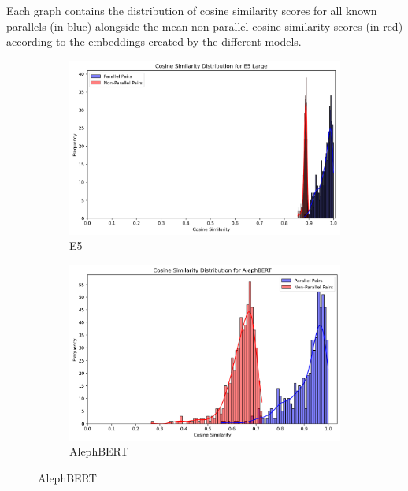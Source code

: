 \documentclass[12pt]{article}
\begin{document}
Each graph contains the distribution of cosine similarity scores for all known parallels (in blue) alongside the mean non-parallel cosine similarity scores (in red) according to the embeddings created by the different models.

\begin{figure}[htbp]
\centering

\begin{subfigure}{0.45\textwidth}
    \centering
    \includegraphics[width=\linewidth]{nonpar_par_histogram_E5Large.png}
    \caption{E5}
    \label{fig:e5_dist}
\end{subfigure}
\hfill
\begin{subfigure}{0.45\textwidth}
    \centering
    \includegraphics[width=\linewidth]{nonpar_par_histogram_AlephBERT.png}
    \caption{AlephBERT}
    \label{fig:alephbert_dist}
\end{subfigure}


\end{figure}
\end{document}
